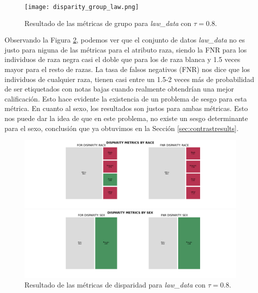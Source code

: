 \begin{figure}[h]
	\hspace{-2.5cm}
	\texttt{[image: disparity\_group\_law.png]}
	\caption{Resultado de las métricas de grupo para \textit{law\_data} con $\tau=0.8$.}
    \label{fig:lawdgroup}
\end{figure}

\clearpage

Observando la Figura \ref{fig:lawdisparity}, podemos ver que el conjunto de datos \textit{law\_data} no es justo para niguna de las métricas para el atributo raza, siendo la FNR para los individuos de raza negra casi el doble que para los de raza blanca y 1.5 veces mayor para el resto de razas. La tasa de falsos negativos (FNR) nos dice que los individuos de cualquier raza, tienen casi entre un 1.5-2 veces más de probabilidad de ser etiquetados con notas bajas cuando realmente obtendrían una mejor calificación. Esto hace evidente la existencia de un problema de sesgo para esta métrica.  En cuanto al sexo, los resultados son justos para ambas métricas. Esto nos puede dar la idea de que en este problema, no existe un sesgo determinante para el sexo, conclusión que ya obtuvimos en la Sección \ref{sec:contrastresults}.\\

\begin{figure}[h]
	\hspace{-2.5cm}
	\includegraphics[width=21.3cm]{images/disparity_law_race.png}
	
	\hspace{-2.5cm}
	\includegraphics[width=21.3cm]{images/disparity_law_sex.png}
	\caption{Resultado de las métricas de disparidad para \textit{law\_data} con $\tau=0.8$.}
    \label{fig:lawdisparity}
\end{figure}